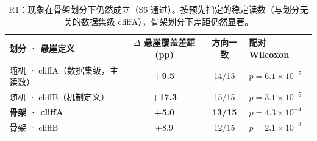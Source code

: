 \documentclass[UTF8, 11pt, a4paper]{ctexart}
\begin{document}
\begin{table}[htbp]
  \centering
  \caption{R1：现象在骨架划分下仍然成立（S6 通过）。按预先指定的稳定读数（与划分无关的数据集级 cliffA），骨架划分下差距仍然显著。}
  \label{tab:r1}
  \begin{tabular}{@{} l S[table-format=+1.1] c l @{}}
    \toprule
    划分 · 悬崖定义 & {$\Delta$ 悬崖覆盖差距 (pp)} & {方向一致} & {配对 Wilcoxon} \\
    \midrule
    随机 · cliffA（数据集级，主读数） & {\bfseries +9.5} & 14/15 & $p = 6.1\times10^{-5}$ \\
    随机 · cliffB（机制定义）         & {\bfseries +17.3} & 15/15 & $p = 3.1\times10^{-5}$ \\
    \textbf{骨架 · cliffA}            & {\bfseries +5.0} & \textbf{13/15} & \textbf{$p = 4.3\times10^{-4}$} \\
    骨架 · cliffB                     & +8.9 & 12/15 & $p = 2.1\times10^{-3}$ \\
    \bottomrule
  \end{tabular}
\end{table}
\end{document}
